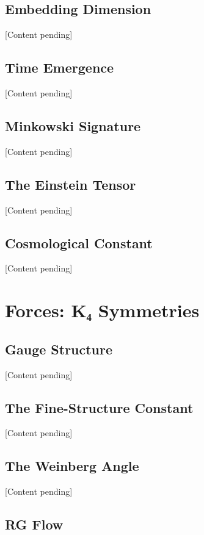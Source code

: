 \documentclass[11pt,a4paper]{book}
\begin{document}
\chapter{Embedding Dimension}

[Content pending]

\chapter{Time Emergence}

[Content pending]

\chapter{Minkowski Signature}

[Content pending]

\chapter{The Einstein Tensor}

[Content pending]

\chapter{Cosmological Constant}

[Content pending]


\part{Forces: K₄ Symmetries}

\chapter{Gauge Structure}

[Content pending]

\chapter{The Fine-Structure Constant}

[Content pending]

\chapter{The Weinberg Angle}

[Content pending]

\chapter{RG Flow}
\end{document}
